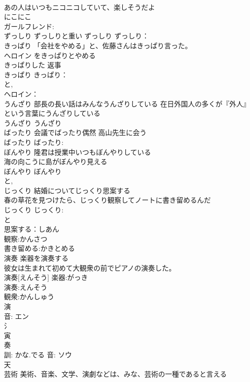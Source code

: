 \documentclass[8pt]{extreport}
\begin{document}
\begin{CJK}{UTF8}{min}
\\	あの人はいつもニコニコしていて、楽しそうだよ 
\\	にこにこ			
\\	ガールフレンド:
\\	ずっしり	ずっしりと重い	ずっしり			ずっしり：
\\	きっぱり	「会社をやめる」と、佐藤さんはきっぱり言った。 
\\	ヘロイン をきっぱりとやめる 
\\	きっぱりした 返事 
\\	きっぱり			きっぱり：
\\	と, 
\\	ヘロイン：
\\	うんざり	部長の長い話はみんなうんざりしている 在日外国人の多くが『外人』という言葉にうんざりしている 
\\	うんざり			うんざり
\\	ばったり	会議でばったり偶然 高山先生に会う 
\\	ばったり			ばったり: 
\\	ぼんやり	隆君は授業中いつもぼんやりしている 
\\	海の向こうに島がぼんやり見える 
\\	ぼんやり			ぼんやり
\\	と, 
\\	じっくり	結婚についてじっくり思案する 
\\	春の草花を見つけたら、じっくり観察してノートに書き留めるんだ 
\\	じっくり			じっくり:
\\	と 
\\	思案する：しあん
\\	観察:かんさつ
\\	書き留める:かきとめる
\\	演奏	楽器を演奏する 
\\	彼女は生まれて初めて大観衆の前でピアノの演奏した。 
\\	演奏[えんそう]			楽器:がっき
\\	演奏:えんそう
\\	観衆:かんしゅう
\\	演 
\\	音: エン 
\\	氵 
\\	寅 
\\	奏 
\\	訓: かな.でる 音: ソウ 
\\	天 
\\	芸術	美術、音楽、文学、演劇などは、みな、芸術の一種であると言える 

\end{CJK}
\end{document}
